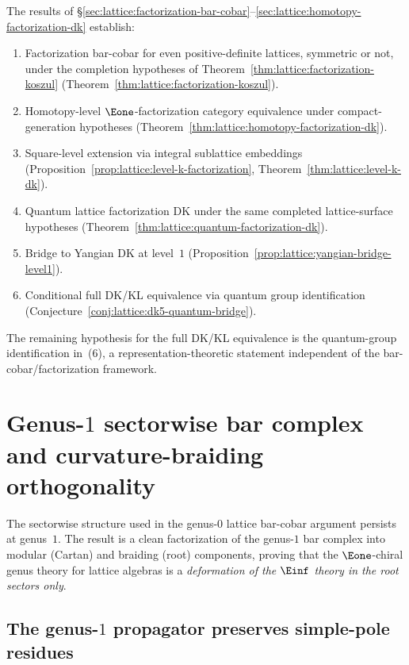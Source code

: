 \begin{remark}
\label{rem:lattice:dk-summary}
The results of \S\ref{sec:lattice:factorization-bar-cobar}--\ref{sec:lattice:homotopy-factorization-dk} establish:
\begin{enumerate}[label=\textup{(\arabic*)}]
\item Factorization bar-cobar for even positive-definite lattices,
 symmetric or not, under the completion hypotheses of
 Theorem~\ref{thm:lattice:factorization-koszul}
 (Theorem~\ref{thm:lattice:factorization-koszul}).
\item Homotopy-level $\Eone$-factorization category equivalence
 under compact-generation hypotheses
 (Theorem~\ref{thm:lattice:homotopy-factorization-dk}).
\item Square-level extension via integral sublattice embeddings
 (Proposition~\ref{prop:lattice:level-k-factorization},
 Theorem~\ref{thm:lattice:level-k-dk}).
\item Quantum lattice factorization DK under the same completed
 lattice-surface hypotheses
 (Theorem~\ref{thm:lattice:quantum-factorization-dk}).
\item Bridge to Yangian DK at level~$1$
 (Proposition~\ref{prop:lattice:yangian-bridge-level1}).
\item Conditional full DK/KL equivalence via quantum group identification
 (Conjecture~\ref{conj:lattice:dk5-quantum-bridge}).
\end{enumerate}
The remaining hypothesis for the full DK/KL equivalence is the
quantum-group identification in~(6), a representation-theoretic
statement independent of the bar-cobar/factorization framework.
\end{remark}

\section{Genus-$1$ sectorwise bar complex and curvature-braiding orthogonality}
\label{sec:lattice:genus1-sectorwise}

The sectorwise structure used in the genus-$0$ lattice bar-cobar
argument persists at genus~$1$. The result is a clean factorization
of the genus-$1$ bar complex into modular (Cartan) and braiding (root)
components, proving that the $\Eone$-chiral genus theory for lattice
algebras is a \emph{deformation of the $\Einf$ theory in the root sectors
only}.

\subsection{The genus-$1$ propagator preserves simple-pole residues}

